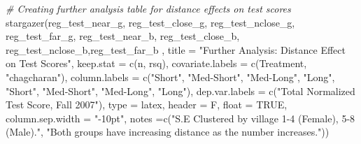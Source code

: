 \documentclass[
]{article}
\newenvironment{Shaded}{\begin{snugshade}}{\end{snugshade}}
\newcommand{\AttributeTok}[1]{\textcolor[rgb]{0.77,0.63,0.00}{#1}}
\newcommand{\CommentTok}[1]{\textcolor[rgb]{0.56,0.35,0.01}{\textit{#1}}}
\newcommand{\ConstantTok}[1]{\textcolor[rgb]{0.00,0.00,0.00}{#1}}
\newcommand{\FunctionTok}[1]{\textcolor[rgb]{0.00,0.00,0.00}{#1}}
\newcommand{\NormalTok}[1]{#1}
\newcommand{\StringTok}[1]{\textcolor[rgb]{0.31,0.60,0.02}{#1}}
\begin{document}
\begin{Shaded}
\begin{Highlighting}[]
\CommentTok{\# Creating further analysis table for distance effects on test scores}
\FunctionTok{stargazer}\NormalTok{(reg\_test\_near\_g, reg\_test\_close\_g, reg\_test\_nclose\_g,}
\NormalTok{          reg\_test\_far\_g, reg\_test\_near\_b, reg\_test\_close\_b, }
\NormalTok{          reg\_test\_nclose\_b,reg\_test\_far\_b , }
          \AttributeTok{title =} \StringTok{"Further Analysis: Distance Effect on Test Scores"}\NormalTok{,}
          \AttributeTok{keep.stat =} \FunctionTok{c}\NormalTok{(}\StringTok{\textquotesingle{}n\textquotesingle{}}\NormalTok{, }\StringTok{\textquotesingle{}rsq\textquotesingle{}}\NormalTok{),}
          \AttributeTok{covariate.labels =} \FunctionTok{c}\NormalTok{(}\StringTok{\textquotesingle{}Treatment\textquotesingle{}}\NormalTok{, }\StringTok{"chagcharan"}\NormalTok{), }
          \AttributeTok{column.labels =} \FunctionTok{c}\NormalTok{(}\StringTok{"Short"}\NormalTok{, }\StringTok{"Med{-}Short"}\NormalTok{, }\StringTok{"Med{-}Long"}\NormalTok{, }\StringTok{"Long"}\NormalTok{, }
                            \StringTok{"Short"}\NormalTok{, }\StringTok{"Med{-}Short"}\NormalTok{, }\StringTok{"Med{-}Long"}\NormalTok{, }\StringTok{"Long"}\NormalTok{),}
          \AttributeTok{dep.var.labels =} \FunctionTok{c}\NormalTok{(}\StringTok{"Total Normalized Test Score, Fall 2007"}\NormalTok{), }
          \AttributeTok{type =} \StringTok{\textquotesingle{}latex\textquotesingle{}}\NormalTok{, }\AttributeTok{header =}\NormalTok{ F, }\AttributeTok{float =} \ConstantTok{TRUE}\NormalTok{,}
          \AttributeTok{column.sep.width =} \StringTok{"{-}10pt"}\NormalTok{,}
          \AttributeTok{notes =}\FunctionTok{c}\NormalTok{(}\StringTok{"S.E Clustered by village 1{-}4 (Female), 5{-}8 (Male)."}\NormalTok{, }
          \StringTok{"Both groups have increasing distance as the number increases."}\NormalTok{))}
\end{Highlighting}
\end{Shaded}
\end{document}
